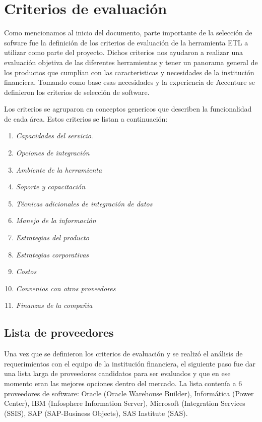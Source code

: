 \documentclass[a4paper,openright,12pt]{book}
\begin{document}
\section{Criterios de evaluaci\'on}
Como mencionamos al inicio del documento, parte importante de la selecci\'on de sofware fue la definici\'on de los criterios de evaluaci\'on de la herramienta ETL a utilizar como parte del proyecto. Dichos criterios nos ayudaron a realizar una evaluaci\'on objetiva de las diferentes herramientas y tener un panorama general de los productos que cumpl\'ian con las caracteristicas y necesidades de la instituci\'on financiera. Tomando como base esas necesidades y la experiencia de Accenture se definieron los criterios de selecci\'on de software.

Los criterios se agruparon en conceptos genericos que describen la funcionalidad de cada \'area. Estos criterios se listan a continuaci\'on:

\begin{enumerate}
\item \textit{Capacidades del servicio}.
\item \textit{Opciones de integraci\'on}
\item \textit{Ambiente de la herramienta}
\item \textit{Soporte y capacitaci\'on}
\item \textit{T\'ecnicas adicionales de integraci\'on de datos}
\item \textit{Manejo de la informaci\'on}
\item \textit{Estrategias del producto}
\item \textit{Estrategias corporativas}
\item \textit{Costos}
\item \textit{Convenios con otros proveedores}
\item \textit{Finanzas de la compa\~nia}
\end{enumerate} 

\subsection{Lista de proveedores}
Una vez que se definieron los criterios de evaluaci\'on y se realiz\'o el an\'alisis de requerimientos con el equipo de la instituci\'on financiera, el siguiente paso fue dar una lista larga de proveedores candidatos para ser evaluados y que en ese momento eran las mejores opciones dentro del mercado. La lista conten\'ia a 6 proveedores de software: Oracle (Oracle Warehouse Builder), Inform\'atica (Power Center), IBM (Infosphere Information Server), Microsoft (Integration Services (SSIS), SAP (SAP-Business Objects), SAS Institute (SAS).
\end{document}
